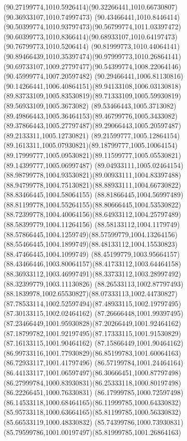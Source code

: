 {{		\curveto(90.27199774,1010.5926414)(90.32266441,1010.66730807)(90.36933107,1010.74997473)
		\curveto(90.43466441,1010.8446414)(90.50399774,1010.93797473)(90.56799774,1011.03397472)
		\curveto(90.60399773,1010.8366414)(90.68933107,1010.64197473)(90.76799773,1010.5206414)
		\curveto(90.81999773,1010.44064141)(90.89466439,1010.35397474)(90.97999773,1010.26864141)
		\curveto(90.69733107,1009.27797477)(90.54399774,1008.22064146)(90.45999774,1007.20597482)
		\curveto(90.29466441,1006.81130816)(90.14266441,1006.40864151)(89.94133108,1006.03130818)
		\curveto(89.83733109,1005.83530819)(89.71333109,1005.59930819)(89.56933109,1005.3673082)
		\curveto(89.53466443,1005.3713082)(89.49866443,1005.36464153)(89.46799776,1005.3433082)
		\curveto(89.37866443,1005.27797487)(89.29066443,1005.20597487)(89.2133311,1005.12730821)
		\curveto(89.21599777,1005.12864154)(89.1613311,1005.07930821)(89.18799777,1005.10064154)
		\curveto(89.17999777,1005.09530821)(89.11599777,1005.05530821)(89.14399777,1005.06997487)
		\curveto(89.04933111,1005.02464154)(88.98799778,1004.93530821)(89.00933111,1004.83397488)
		\curveto(88.94799778,1004.75130821)(88.88933111,1004.66730822)(88.83466445,1004.58064155)
		\curveto(88.81866445,1004.56997489)(88.81199778,1004.55264155)(88.80666445,1004.53530822)
		\curveto(88.72399778,1004.40064156)(88.64933112,1004.25797489)(88.58399779,1004.11264156)
		\curveto(88.58133112,1004.1179749)(88.57866445,1004.1259749)(88.57599779,1004.13264156)
		\curveto(88.55466445,1004.1899749)(88.48133112,1004.15530823)(88.47466445,1004.1099749)
		\curveto(88.45199779,1003.95664157)(88.43466446,1003.80064157)(88.41733112,1003.64464158)
		\curveto(88.36933112,1003.46997491)(88.33733112,1003.28997492)(88.32399779,1003.11130826)
		\curveto(88.26533113,1002.87797493)(88.1839978,1002.65530827)(88.07333113,1002.44730827)
		\curveto(87.78533114,1002.52597494)(87.48933115,1002.19797495)(87.30133115,1002.02464162)
		\curveto(87.26666448,1001.99397495)(87.23466449,1001.95930828)(87.20266449,1001.92464162)
		\curveto(87.18799782,1001.92197495)(87.17333115,1001.91530829)(87.16133115,1001.90464162)
		\lineto(87.15866449,1001.90464162)
		\curveto(86.99733116,1001.77930829)(86.85199783,1001.60064163)(86.72933117,1001.41797496)
		\curveto(86.57199784,1001.24464164)(86.44133117,1001.06597497)(86.30666451,1000.87797498)
		\curveto(86.27999784,1000.83930831)(86.25333118,1000.80197498)(86.22266451,1000.76330831)
		\curveto(86.17999785,1000.72597498)(86.14533118,1000.68464165)(86.11999785,1000.64330832)
		\curveto(85.95733118,1000.63664165)(85.81199785,1000.56330832)(85.66533119,1000.48330832)
		\curveto(85.74399786,1000.73930831)(85.79599786,1001.00197497)(85.81999785,1001.26864163)
}}
